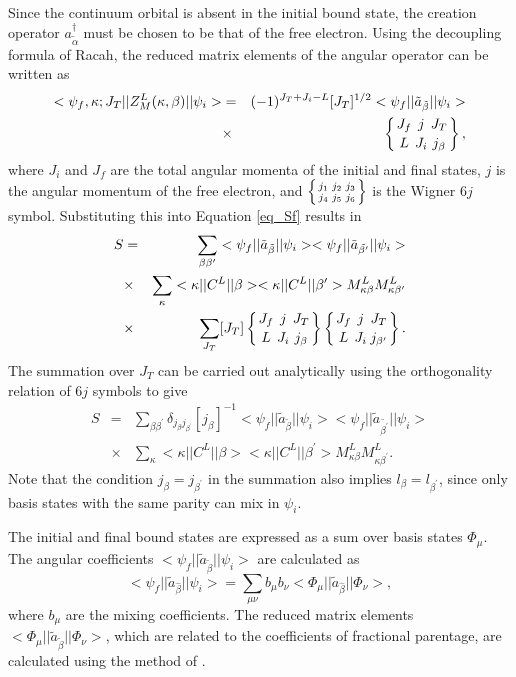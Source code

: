 \documentclass{elsart}
\newcommand{\sixj}[6]{\ensuremath{\left\{{#1\atop #4}{#2\atop #5}
{#3\atop #6}\right\}}}
\begin{document}
Since the continuum orbital is absent in the initial bound state, the creation
operator $a^{\dagger}_{\tilde{\alpha}}$ must be chosen to be that of the free
electron. Using the decoupling formula of Racah, the reduced matrix elements
of the angular operator can be written as
\begin{eqnarray}
<\psi_f,\kappa;J_T||Z^L_M(\kappa,\beta)||\psi_i> &=&
 (-1)^{J_T+J_i-L}[J_T]^{1/2}
<\psi_f||\tilde{a}_{\tilde{\beta}}||\psi_i>\nonumber\\
&\times& \sixj{J_f}{j}{J_T}{L}{J_i}{j_\beta},
\end{eqnarray}
where $J_i$ and $J_f$ are the total angular momenta of the initial and final
states, $j$ is the angular momentum of the free electron, and
\sixj{j_1}{j_2}{j_3}{j_4}{j_5}{j_6} is the Wigner $6j$ symbol. Substituting
this into Equation \ref{eq_Sf} results in
\begin{eqnarray}
S &=&\sum_{\beta\beta^\prime}
<\psi_f||\tilde{a}_{\tilde{\beta}}||\psi_i>
<\psi_f||\tilde{a}_{\tilde{\beta^\prime}}||\psi_i>  
\nonumber\\
&\times& \sum_{\kappa}<\kappa||C^L||\beta><\kappa||C^L||\beta^\prime>
M^L_{\kappa\beta}M^L_{\kappa\beta^\prime}
\nonumber\\
&\times&\sum_{J_T}[J_T]\sixj{J_f}{j}{J_T}{L}{J_i}{j_\beta}
\sixj{J_f}{j}{J_T}{L}{J_i}{j_{\beta^\prime}}.
\end{eqnarray}
The summation over $J_T$ can be carried out analytically using the
orthogonality relation of $6j$ symbols to give
\begin{eqnarray}
S &=& \sum_{\beta\beta^\prime} \delta_{j_\beta j_{\beta^\prime}}[j_\beta]^{-1}
<\psi_f||\tilde{a}_{\tilde{\beta}}||\psi_i>
<\psi_f||\tilde{a}_{\tilde{\beta^\prime}}||\psi_i>  
\nonumber\\
&\times&\sum_{\kappa}<\kappa||C^L||\beta><\kappa||C^L||\beta^\prime>
M^L_{\kappa\beta}M^L_{\kappa\beta^\prime}.
\end{eqnarray}
Note that the condition $j_\beta = j_{\beta^\prime}$ in the summation also
implies $l_\beta = l_{\beta^\prime}$, since only basis states with the same
parity can mix in $\psi_i$. 

The initial and final bound states are expressed as a sum over basis states
$\Phi_\mu$. The angular coefficients
$<\psi_f||\tilde{a}_{\tilde{\beta}}||\psi_i>$ are calculated as
\begin{equation}
<\psi_f||\tilde{a}_{\hat{\beta}}||\psi_i> = \sum_{\mu\nu}b_\mu b_\nu
<\Phi_\mu||\tilde{a}_{\hat{\beta}}||\Phi_\nu>,
\end{equation}
where $b_\mu$ are the mixing coefficients. The reduced matrix elements
$<\Phi_\mu||\tilde{a}_{\tilde{\beta}}||\Phi_\nu>$, which are related to the
coefficients of fractional parentage, are calculated using the method of
\citet{gaigalas97}. 
\end{document}
